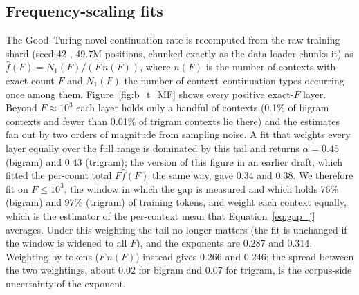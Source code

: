 


\subsection{Frequency-scaling fits}
\label{app:gt-fits}

The Good--Turing novel-continuation rate is recomputed from the raw training shard (seed-42 , 49.7M positions, chunked exactly as the data loader chunks it) as $\hat f(F)=N_1(F)/(F\,n(F))$, where $n(F)$ is the number of contexts with exact count $F$ and $N_1(F)$ the number of context--continuation types occurring once among them. Figure~\ref{fig:b_t_MF} shows every positive exact-$F$ layer. Beyond $F\approx10^3$ each layer holds only a handful of contexts (0.1\% of bigram contexts and fewer than 0.01\% of trigram contexts lie there) and the estimates fan out by two orders of magnitude from sampling noise. A fit that weights every layer equally over the full range is dominated by this tail and returns $\alpha=0.45$ (bigram) and $0.43$ (trigram); the version of this figure in an earlier draft, which fitted the per-count total $F\hat f(F)$ the same way, gave $0.34$ and $0.38$. We therefore fit on $F\le10^3$, the window in which the gap is measured and which holds 76\% (bigram) and 97\% (trigram) of training tokens, and weight each context equally, which is the estimator of the per-context mean that Equation~\eqref{eq:gap_j} averages. Under this weighting the tail no longer matters (the fit is unchanged if the window is widened to all $F$), and the exponents are $0.287$ and $0.314$. Weighting by tokens ($F\,n(F)$) instead gives $0.266$ and $0.246$; the spread between the two weightings, about $0.02$ for bigram and $0.07$ for trigram, is the corpus-side uncertainty of the exponent.

